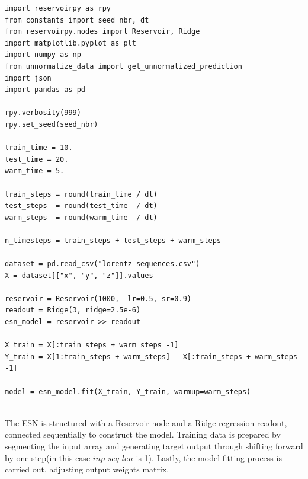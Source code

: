 \documentclass[11pt]{article}
\begin{document}
\begin{lstlisting}[caption={ESN implementation}, label=reservoir]
import reservoirpy as rpy
from constants import seed_nbr, dt
from reservoirpy.nodes import Reservoir, Ridge
import matplotlib.pyplot as plt
import numpy as np
from unnormalize_data import get_unnormalized_prediction
import json
import pandas as pd

rpy.verbosity(999)
rpy.set_seed(seed_nbr)

train_time = 10.
test_time = 20.
warm_time = 5.

train_steps = round(train_time / dt)
test_steps  = round(test_time  / dt)
warm_steps  = round(warm_time  / dt)

n_timesteps = train_steps + test_steps + warm_steps

dataset = pd.read_csv("lorentz-sequences.csv")
X = dataset[["x", "y", "z"]].values

reservoir = Reservoir(1000,  lr=0.5, sr=0.9)
readout = Ridge(3, ridge=2.5e-6)
esn_model = reservoir >> readout

X_train = X[:train_steps + warm_steps -1]
Y_train = X[1:train_steps + warm_steps] - X[:train_steps + warm_steps -1]

model = esn_model.fit(X_train, Y_train, warmup=warm_steps)
    
\end{lstlisting}

The ESN is structured with a Reservoir node and a Ridge regression readout, connected sequentially to construct the model. Training data is prepared by segmenting the input array and generating target output through shifting forward by one step(in this case $inp\_seq\_len$ is 1). Lastly, the model fitting process is carried out, adjusting output weights matrix.
\end{document}
